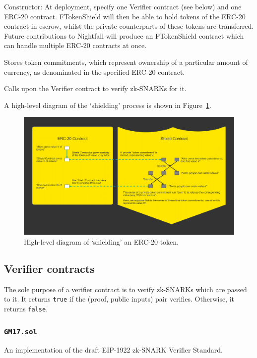 Constructor: At deployment, specify one Verifier contract (see below) and one ERC-20 contract. FTokenShield will then be able to hold tokens of the ERC-20 contract in escrow, whilst the private counterparts of these tokens are transferred. Future contributions to Nightfall will produce an FTokenShield contract which can handle multiple ERC-20 contracts at once.

Stores token commitments, which represent ownership of a particular amount of currency, as denominated in the specified ERC-20 contract.

Calls upon the Verifier contract to verify zk-SNARKs for it.

A high-level diagram of the `shielding' process is shown in Figure~\ref{pic:ftShield}.

\begin{figure}[H]
	\begin{center}
		\includegraphics[width=\textwidth]{images/erc20Shielding.png}
	\end{center}
	\caption{High-level diagram of `shielding' an ERC-20 token.}
	\label{pic:ftShield}
\end{figure}

\subsection{Verifier contracts}
The sole purpose of a verifier contract is to verify zk-SNARKs which are passed to it. It returns \texttt{true} if the (proof, public inputs) pair verifies. Otherwise, it returns \texttt{false}.

\subsubsection{\texttt{GM17.sol}}
An implementation of the draft EIP-1922 zk-SNARK Verifier Standard. 


